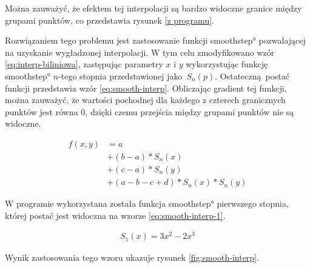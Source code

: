 Można zauważyć, że efektem tej interpolacji są bardzo widoczne granice między grupami punktów, co przedstawia rysunek \ref{z programu}.

Rozwiązaniem tego problemu jest zastosowanie funkcji \ang{smoothstep} pozwalającej na uzyskanie wygładzonej interpolacji. W tym celu zmodyfikowano wzór \ref{eq:interp-biliniowa}, zastępując parametry $x$ i $y$ wykorzystując funkcję \ang{smoothstep} $n$-tego stopnia przedstawionej jako $S_n(p)$. Ostateczną postać funkcji przedstawia wzór \ref{eq:smooth-interp}. Obliczając gradient tej funkcji, można zauważyć, że wartości pochodnej dla każdego z czterech granicznych punktów jest równa $0$, dzięki czemu przejścia między grupami punktów nie są widoczne.

\begin{equation}
\label{eq:smooth-interp}
  \begin{split}
    f(x, y) & = a \\
       & + (b - a) * S_n(x) \\
       & + (c - a) * S_n(y) \\
       & + (a - b - c + d) * S_n(x) * S_n(y)
    \end{split}
\end{equation}

W programie wykorzystana została funkcja \ang{smoothstep} pierwszego stopnia, której postać jest widoczna na wzorze \ref{eq:smooth-interp-1}.

\begin{equation}
\label{eq:smooth-interp-1}
  \begin{split}
    S_1(x) = 3x^2 - 2x^3
  \end{split}
\end{equation}

Wynik zastosowania tego wzoru ukazuje rysunek \ref{fig:smooth-interp}.


